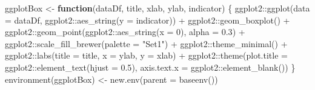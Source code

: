 \documentclass[
]{article}
\newenvironment{Shaded}{\begin{snugshade}}{\end{snugshade}}
\newcommand{\AttributeTok}[1]{\textcolor[rgb]{0.77,0.63,0.00}{#1}}
\newcommand{\ControlFlowTok}[1]{\textcolor[rgb]{0.13,0.29,0.53}{\textbf{#1}}}
\newcommand{\DecValTok}[1]{\textcolor[rgb]{0.00,0.00,0.81}{#1}}
\newcommand{\FloatTok}[1]{\textcolor[rgb]{0.00,0.00,0.81}{#1}}
\newcommand{\FunctionTok}[1]{\textcolor[rgb]{0.00,0.00,0.00}{#1}}
\newcommand{\NormalTok}[1]{#1}
\newcommand{\OtherTok}[1]{\textcolor[rgb]{0.56,0.35,0.01}{#1}}
\newcommand{\SpecialCharTok}[1]{\textcolor[rgb]{0.00,0.00,0.00}{#1}}
\newcommand{\StringTok}[1]{\textcolor[rgb]{0.31,0.60,0.02}{#1}}
\begin{document}
\begin{Shaded}
\begin{Highlighting}[]
\NormalTok{ggplotBox }\OtherTok{\textless{}{-}} \ControlFlowTok{function}\NormalTok{(dataDf, title, xlab, ylab, indicator) \{}
\NormalTok{  ggplot2}\SpecialCharTok{::}\FunctionTok{ggplot}\NormalTok{(}\AttributeTok{data =}\NormalTok{ dataDf, ggplot2}\SpecialCharTok{::}\FunctionTok{aes\_string}\NormalTok{(}\AttributeTok{y =}\NormalTok{ indicator)) }\SpecialCharTok{+} 
\NormalTok{    ggplot2}\SpecialCharTok{::}\FunctionTok{geom\_boxplot}\NormalTok{() }\SpecialCharTok{+}
\NormalTok{    ggplot2}\SpecialCharTok{::}\FunctionTok{geom\_point}\NormalTok{(ggplot2}\SpecialCharTok{::}\FunctionTok{aes\_string}\NormalTok{(}\AttributeTok{x =} \DecValTok{0}\NormalTok{), }\AttributeTok{alpha =} \FloatTok{0.3}\NormalTok{) }\SpecialCharTok{+}
\NormalTok{    ggplot2}\SpecialCharTok{::}\FunctionTok{scale\_fill\_brewer}\NormalTok{(}\AttributeTok{palette =} \StringTok{"Set1"}\NormalTok{) }\SpecialCharTok{+}
\NormalTok{    ggplot2}\SpecialCharTok{::}\FunctionTok{theme\_minimal}\NormalTok{() }\SpecialCharTok{+}
\NormalTok{    ggplot2}\SpecialCharTok{::}\FunctionTok{labs}\NormalTok{(}\AttributeTok{title =}\NormalTok{ title, }\AttributeTok{x =}\NormalTok{ ylab, }\AttributeTok{y =}\NormalTok{ xlab) }\SpecialCharTok{+}
\NormalTok{    ggplot2}\SpecialCharTok{::}\FunctionTok{theme}\NormalTok{(}\AttributeTok{plot.title =}\NormalTok{ ggplot2}\SpecialCharTok{::}\FunctionTok{element\_text}\NormalTok{(}\AttributeTok{hjust =} \FloatTok{0.5}\NormalTok{),}
                   \AttributeTok{axis.text.x =}\NormalTok{ ggplot2}\SpecialCharTok{::}\FunctionTok{element\_blank}\NormalTok{())}
\NormalTok{\}}
\FunctionTok{environment}\NormalTok{(ggplotBox) }\OtherTok{\textless{}{-}} \FunctionTok{new.env}\NormalTok{(}\AttributeTok{parent =} \FunctionTok{baseenv}\NormalTok{())}


\end{Highlighting}
\end{Shaded}
\end{document}
